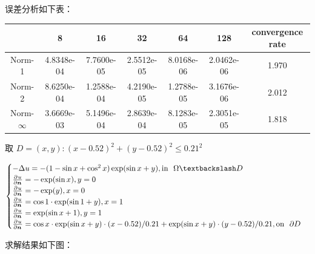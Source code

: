 \documentclass[lang=cn,a4paper,newtx,bibend=bibtex]{elegantpaper}
\begin{document}
误差分析如下表：

\begin{table}[H]
  \centering
  \begin{tabular}{|c|c|c|c|c|c|c|}
  \hline
   & 8 & 16 & 32 & 64 & 128 & convergence rate \\
  \hline
  Norm-1 & 4.8348e-04 & 7.7600e-05 & 2.5512e-05 & 8.0168e-06 & 2.0462e-06 & 1.970 \\
  Norm-2 & 8.6250e-04 & 1.2588e-04 & 4.2190e-05 & 1.2788e-05 & 3.1676e-06 & 2.012 \\
  Norm-$\infty$ & 3.6669e-03 & 5.1496e-04 & 2.8639e-04 & 8.1283e-05 & 2.3051e-05 & 1.818 \\
  \hline
  \end{tabular}
\end{table}



取 $D = {(x, y) : (x - 0.52)^2 + (y - 0.52)^2 \le 0.21^2}$

\[
  \begin{cases}
    - \Delta u = -(1 - \sin x + \cos^2 x) \exp(\sin x + y), \text{in~~} \Omega\fxg D \\
    \apart{u}{\bm{n}}{} = -\exp(\sin x), y = 0 \\
    \apart{u}{\bm{n}}{} = -\exp(y), x = 0 \\
    \apart{u}{\bm{n}}{} = \cos 1 \cdot \exp(\sin 1 + y), x = 1 \\ 
    \apart{u}{\bm{n}}{} = \exp(\sin x + 1), y = 1 \\
    \apart{u}{\bm{n}}{} = \cos x \cdot \exp(\sin x + y) \cdot (x - 0.52)/0.21 + \exp(\sin x + y) \cdot (y - 0.52) / 0.21, \text{on~~} \partial D
  \end{cases}
\]

求解结果如下图：
\end{document}
